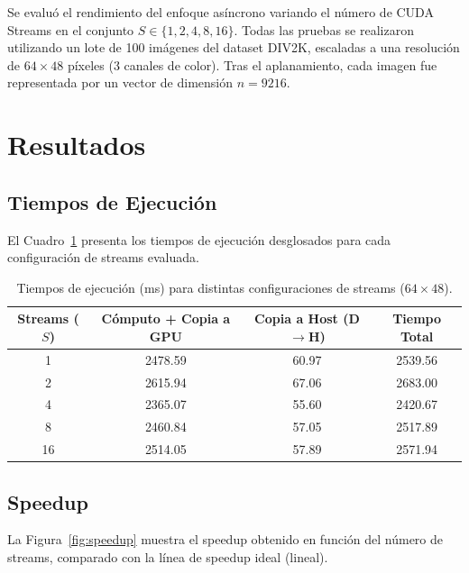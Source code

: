 \documentclass[12pt, a4paper]{article}
\begin{document}
Se evaluó el rendimiento del enfoque asíncrono variando el número de CUDA
Streams en el conjunto $S \in \{1, 2, 4, 8, 16\}$. Todas las pruebas se
realizaron utilizando un lote de 100 imágenes del dataset DIV2K, escaladas 
a una resolución de $64 \times 48$ píxeles (3 canales de color). Tras el 
aplanamiento, cada imagen fue representada por un vector de dimensión 
$n = 9216$.

\section{Resultados}

\subsection{Tiempos de Ejecución}

El Cuadro~\ref{tab:tiempos} presenta los tiempos de ejecución desglosados
para cada configuración de streams evaluada.

\begin{table}[H]
    \centering
    \caption{Tiempos de ejecución (ms) para distintas configuraciones de
    streams ($64 \times 48$).}
    \label{tab:tiempos}
    \begin{tabular}{cccc}
        \toprule
        \textbf{Streams ($S$)} &
        \textbf{Cómputo + Copia a GPU} &
        \textbf{Copia a Host (D$\to$H)} &
        \textbf{Tiempo Total} \\
        \midrule
        1  & 2478.59 & 60.97 & 2539.56 \\
        2  & 2615.94 & 67.06 & 2683.00 \\
        4  & 2365.07 & 55.60 & 2420.67 \\
        8  & 2460.84 & 57.05 & 2517.89 \\
        16 & 2514.05 & 57.89 & 2571.94 \\
        \bottomrule
    \end{tabular}
\end{table}

\subsection{Speedup}

La Figura~\ref{fig:speedup} muestra el speedup obtenido en función del número
de streams, comparado con la línea de speedup ideal (lineal).
\end{document}
